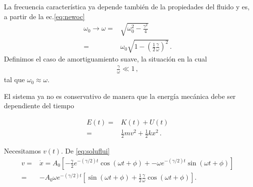 La frecuencia característica ya depende también de la propiedades del fluido y es, a partir de  la ec.\eqref{eq:newoc}
\begin{align*}
  \omega_0\to \omega=&\sqrt{\omega_0^2-\frac{\gamma^2}{4}}\nonumber\\
=&\omega_0\sqrt{1-\left(\frac{1}{2}\frac{\gamma}{\omega}\right)^2}\,.
\end{align*}
Definimos el caso de amortiguamiento suave, la situación en la cual
\begin{align}
  \label{eq:SoftDamping}
  \frac{\gamma}{\omega}\ll 1\,,
\end{align}
tal que $\omega_0\approx\omega$. 

El sistema ya no es conservativo de manera que la energía mecánica debe ser dependiente del tiempo

\begin{align*}
  E(t)=&K(t)+U(t)\nonumber\\
=&\tfrac{1}{2}m v^2+\tfrac{1}{2}k x^2\,.
\end{align*}

Necesitamos $v(t)$. De \eqref{eq:soluflui}
\begin{align*}
  v=&\dot{x}=A_0 \left[-\frac{\gamma}{2}e^{-(\gamma/2)t}\cos(\omega t+\phi)+
            -\omega e^{-(\gamma/2)t}\sin(\omega t+\phi)\right]\nonumber\\
=&-A_0 \omega e^{-(\gamma/2)t} \left[\sin(\omega t+\phi)+\frac{1}{2}\frac{\gamma}{\omega}\cos(\omega t+\phi)\right].
\end{align*}

